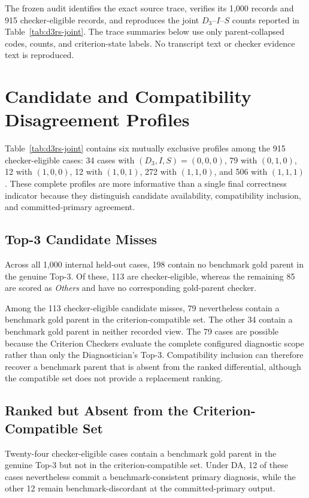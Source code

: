 The frozen audit identifies the exact source trace, verifies its 1,000 records and 915 checker-eligible records, and reproduces the joint $D_3$--$I$--$S$ counts reported in Table~\ref{tab:d3rs-joint}. The trace summaries below use only parent-collapsed codes, counts, and criterion-state labels. No transcript text or checker evidence text is reproduced.

\section{Candidate and Compatibility Disagreement Profiles}
\label{sec:ch8-stagewise-taxonomy}

Table~\ref{tab:d3rs-joint} contains six mutually exclusive profiles among the 915 checker-eligible cases: 34 cases with $(D_3,I,S)=(0,0,0)$, 79 with $(0,1,0)$, 12 with $(1,0,0)$, 12 with $(1,0,1)$, 272 with $(1,1,0)$, and 506 with $(1,1,1)$. These complete profiles are more informative than a single final correctness indicator because they distinguish candidate availability, compatibility inclusion, and committed-primary agreement.

\subsection{Top-3 Candidate Misses}

Across all 1,000 internal held-out cases, 198 contain no benchmark gold parent in the genuine Top-3. Of these, 113 are checker-eligible, whereas the remaining 85 are scored as \emph{Others} and have no corresponding gold-parent checker.

Among the 113 checker-eligible candidate misses, 79 nevertheless contain a benchmark gold parent in the criterion-compatible set. The other 34 contain a benchmark gold parent in neither recorded view. The 79 cases are possible because the Criterion Checkers evaluate the complete configured diagnostic scope rather than only the Diagnostician's Top-3. Compatibility inclusion can therefore recover a benchmark parent that is absent from the ranked differential, although the compatible set does not provide a replacement ranking.

\subsection{Ranked but Absent from the Criterion-Compatible Set}

Twenty-four checker-eligible cases contain a benchmark gold parent in the genuine Top-3 but not in the criterion-compatible set. Under DA, 12 of these cases nevertheless commit a benchmark-consistent primary diagnosis, while the other 12 remain benchmark-discordant at the committed-primary output.

